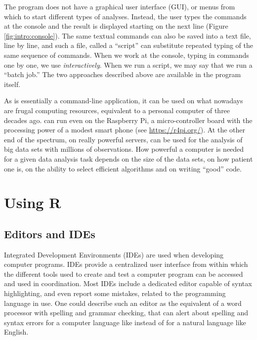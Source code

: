 \documentclass[krantz2]{krantz}\usepackage{knitr}
\begin{document}
The \Rpgrm program does not have a graphical user interface (GUI), or menus from which to start different types of analyses. Instead, the user types the commands at the \Rpgrm console and the result is displayed starting on the next line (Figure \ref{fig:intro:console}). The same textual commands can also be saved into a text file, line by line, and such a file, called a ``script'' can substitute repeated typing of the same sequence of commands. When we work at the console, typing in commands one by one, we use \Rlang \emph{interactively}. When we run a script, we may say that we run a ``batch job.'' The two approaches described above are available in the \Rpgrm program itself.

\begin{explainbox}
As \Rpgrm is essentially a command-line application, it can be used on what nowadays are frugal computing resources, equivalent to a personal computer of three decades ago. \Rpgrm can run even on the Raspberry Pi, a micro-controller board with the processing power of a modest smart phone (see \url{https://r4pi.org/}). At the other end of the spectrum, on really powerful servers, \Rpgrm can be used for the analysis of big data sets with millions of observations. How powerful a computer is needed for a given data analysis task depends on the size of the data sets, on how patient one is, on the ability to select efficient algorithms and on writing ``good'' code.
\end{explainbox}

\section{Using R}\label{sec:intro:using:R}

\subsection{Editors and IDEs}
Integrated Development Environments (IDEs) are used when developing computer programs. IDEs provide a centralized user interface from within which the different tools used to create and test a computer program can be accessed and used in coordination. Most IDEs include a dedicated editor capable of syntax highlighting, and even report some mistakes, related to the programming language in use. One could describe such an editor as the equivalent of a word processor with spelling and grammar checking, that can alert about spelling and syntax errors for a computer language like \Rlang instead of for a natural language like English.
\end{document}
